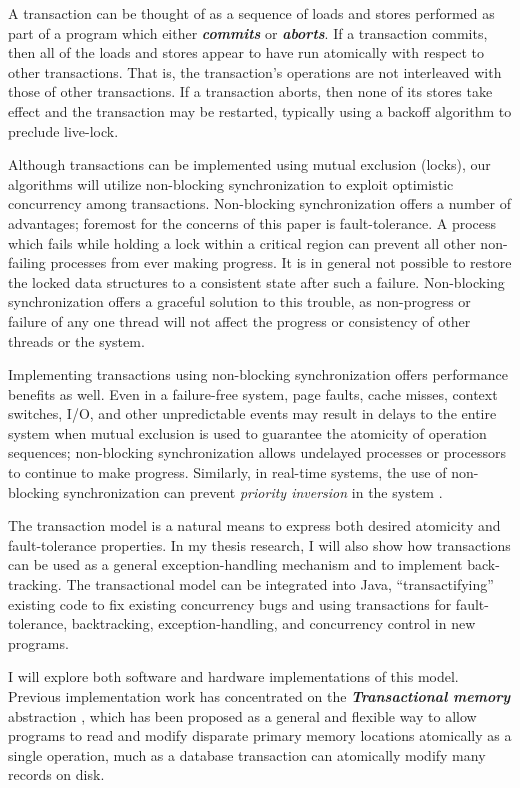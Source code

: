\documentclass[12pt,oneside]{article}
\newcommand{\defn}[1]           {{\textit{\textbf{\boldmath #1}}}}
\begin{document}
A transaction can be thought of as a sequence of loads and stores
performed as part of a program which either
\defn{commits} or \defn{aborts}.  If a transaction
commits, then all of the loads and stores appear to have run
atomically with respect to other transactions.  That is, the
transaction's operations are not interleaved with those of other
transactions.  If a transaction aborts, then none of its stores take
effect and the transaction may be restarted, typically using a
backoff algorithm to preclude live-lock.

Although transactions can be implemented using mutual exclusion
(locks), our algorithms will utilize non-blocking synchronization
\cite{Lamport77,Herlihy88,HerlihyLuMo03,MassalinPu91,GreenwaldCh96} to
exploit optimistic concurrency among transactions.  Non-blocking
synchronization offers a number of advantages; foremost for the
concerns of this paper is fault-tolerance.  A process which fails
while holding a lock within a critical region can prevent all other
non-failing processes from ever making progress.  It is in general not
possible to restore the locked data structures to a consistent state
after such a failure.  Non-blocking synchronization offers a graceful
solution to this trouble, as non-progress or failure of any one thread
will not affect the progress or consistency of other threads or the
system.

Implementing transactions using
non-blocking synchronization offers performance benefits as well.
Even in a failure-free system, page faults, cache misses, context
switches, I/O, and other unpredictable events may result in delays to the
entire system when mutual exclusion is used to guarantee the atomicity
of operation sequences; non-blocking
synchronization allows undelayed processes or processors to continue
to make progress.
Similarly, in real-time systems, the use of non-blocking
synchronization can prevent \emph{priority inversion} in the system
\cite{Jones97}.

The transaction model is a natural means to express both desired
atomicity and fault-tolerance properties.  In my thesis research, I will also
show how transactions can be used as a general exception-handling
mechanism and to implement back-tracking.  The transactional model can be
integrated into Java,  ``transactifying'' existing code to fix
existing concurrency bugs and using transactions for fault-tolerance,
backtracking, exception-handling, and concurrency control in new
programs.

I will explore both software and hardware implementations of this
model.  Previous implementation work has concentrated on the
\defn{Transactional memory} abstraction
\cite{Knight86,HerlihyMo93,StoneStHe93,RajwarGo02,ShavitTo95,HerlihyLuMoSc03},
which has
been proposed as a general and flexible way to allow programs to read
and modify disparate primary memory locations atomically as a single
operation, much as a database transaction can atomically modify many
records on disk.
\end{document}
